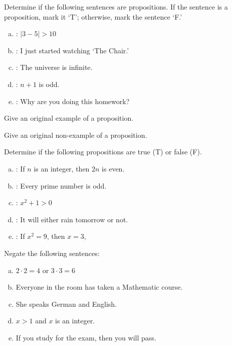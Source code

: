 \documentclass[11pt,letterpaper]{article}
\begin{document}
\homework{}

 Determine if the following sentences are propositions. If the sentence is a proposition, mark it `T'; otherwise, mark the sentence `F.'
	\begin{enumerate}[(a)]
	\item \uans{1.5cm}: $|3 - 5| > 10$
	\item \uans{1.5cm}: I just started watching `The Chair.'
	\item \uans{1.5cm}: The universe is infinite.
	\item \uans{1.5cm}: $n + 1$ is odd.  
	\item \uans{1.5cm}: Why are you doing this homework?
	\end{enumerate}



\newpage



 Give an original example of a proposition.



\newpage



 Give an original non-example of a proposition.



\newpage



 Determine if the following propositions are true (T) or false (F). 
	\begin{enumerate}[(a)]
	\item \uans{1.5cm}: If $n$ is an integer, then $2n$ is even.
	\item \uans{1.5cm}: Every prime number is odd.
	\item \uans{1.5cm}: $x^2 + 1 > 0$
	\item \uans{1.5cm}: It will either rain tomorrow or not.
	\item \uans{1.5cm}: If $x^2= 9$, then $x= 3$,
	\end{enumerate}



\newpage



 Negate the following sentences:
	\begin{enumerate}[(a)]
	\item $2 \cdot 2= 4$ or $3 \cdot 3= 6$
	\item Everyone in the room has taken a Mathematic course.
	\item She speaks German and English. 
	\item $x > 1$ and $x$ is an integer.
	\item If you study for the exam, then you will pass. 
	\end{enumerate}
\end{document}
